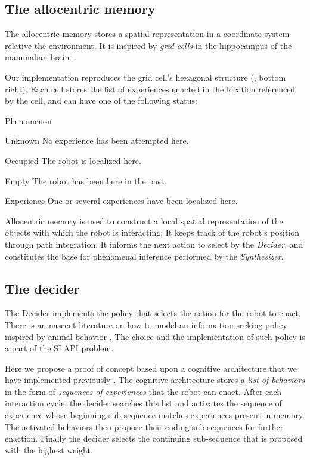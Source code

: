 \documentclass[pmlr]{jmlr}%
\begin{document}
\subsection{The allocentric memory}

The allocentric memory stores a spatial representation in a coordinate system relative the environment. 
It is inspired by \textit{grid cells} in the hippocampus of the mammalian brain \citep{grieves_representation_2017}.

Our implementation reproduces the grid cell's hexagonal structure (, bottom right). 
Each cell stores the list of experiences enacted in the location referenced by the cell, and can have one of the following status:

\begin{altdescription}{Phenomenon}
	\item[Unknown] No experience has been attempted here.
	\item[Occupied] The robot is localized here.
	\item[Empty] The robot has been here in the past.
	\item[Experience] One or several experiences have been localized here.
\end{altdescription}

Allocentric memory is used to construct a local spatial representation of the objects with which the robot is interacting.
It keeps track of the robot's position through path integration. 
It informs the next action to select by the \textit{Decider}, and constitutes the base for phenomenal inference performed by the \textit{Synthesizer}. 

\subsection{The decider}
\label{sec:decider}

The Decider implements the policy that selects the action for the robot to enact. 
There is an nascent literature on how to model an information-seeking policy inspired by animal behavior \citep[e.g.,][]{gottlieb_towards_2018}.
The choice and the implementation of such policy is a part of the SLAPI problem. 

Here we propose a proof of concept based upon a cognitive architecture that we have implemented previously \citep{georgeon_eca_2013}.
The cognitive architecture stores a \textit{list of behaviors} in the form of \textit{sequences of experiences} that the robot can enact. 
After each interaction cycle, the decider searches this list and activates the sequence of experience whose beginning sub-sequence matches experiences present in memory. 
The activated behaviors then propose their ending sub-sequences for further enaction. 
Finally the decider selects the continuing sub-sequence that is proposed with the highest weight. 
\end{document}
